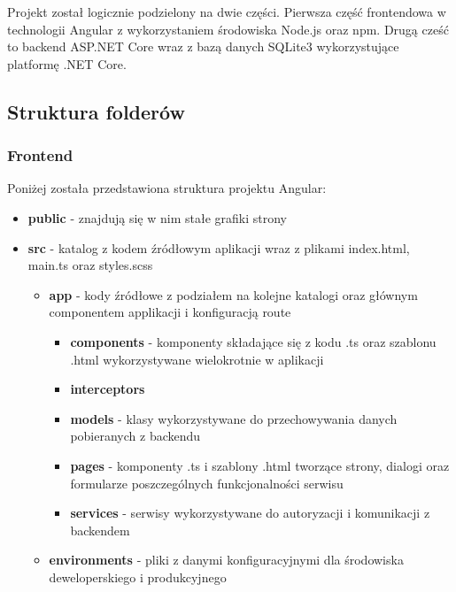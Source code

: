 Projekt został logicznie podzielony na dwie części. Pierwsza część frontendowa w technologii Angular z wykorzystaniem środowiska Node.js oraz npm. Drugą cześć to backend ASP.NET Core wraz z bazą danych SQLite3 wykorzystujące platformę .NET Core.

\subsection{Struktura folderów}

\subsubsection{Frontend}
Poniżej została przedstawiona struktura projektu Angular:
\begin{itemize}
	\item \textbf{public} - znajdują się w nim stałe grafiki strony
	\item \textbf{src} - katalog z kodem źródłowym aplikacji wraz z plikami index.html, main.ts oraz styles.scss
		\begin{itemize}
			\item \textbf{app} - kody źródłowe z podziałem na kolejne katalogi oraz głównym componentem applikacji i konfiguracją route
				\begin{itemize}
					\item \textbf{components} - komponenty składające się z kodu .ts oraz szablonu .html wykorzystywane wielokrotnie w aplikacji
					\item \textbf{interceptors}
					\item \textbf{models} - klasy wykorzystywane do przechowywania danych pobieranych z backendu
					\item \textbf{pages} - komponenty .ts i szablony .html tworzące strony, dialogi oraz formularze poszczególnych funkcjonalności serwisu
					\item \textbf{services} - serwisy wykorzystywane do autoryzacji i komunikacji z backendem
				\end{itemize}
			\item \textbf{environments} - pliki z danymi konfiguracyjnymi dla środowiska deweloperskiego i produkcyjnego
		\end{itemize}
\end{itemize}

